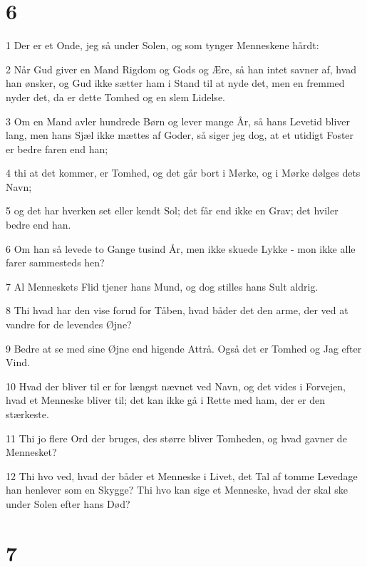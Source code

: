 \chapter{6}

\par 1 Der er et Onde, jeg så under Solen, og som tynger Menneskene hårdt:
\par 2 Når Gud giver en Mand Rigdom og Gods og Ære, så han intet savner af, hvad han ønsker, og Gud ikke sætter ham i Stand til at nyde det, men en fremmed nyder det, da er dette Tomhed og en slem Lidelse.
\par 3 Om en Mand avler hundrede Børn og lever mange År, så hans Levetid bliver lang, men hans Sjæl ikke mættes af Goder, så siger jeg dog, at et utidigt Foster er bedre faren end han;
\par 4 thi at det kommer, er Tomhed, og det går bort i Mørke, og i Mørke dølges dets Navn;
\par 5 og det har hverken set eller kendt Sol; det får end ikke en Grav; det hviler bedre end han.
\par 6 Om han så levede to Gange tusind År, men ikke skuede Lykke - mon ikke alle farer sammesteds hen?
\par 7 Al Menneskets Flid tjener hans Mund, og dog stilles hans Sult aldrig.
\par 8 Thi hvad har den vise forud for Tåben, hvad båder det den arme, der ved at vandre for de levendes Øjne?
\par 9 Bedre at se med sine Øjne end higende Attrå. Også det er Tomhed og Jag efter Vind.
\par 10 Hvad der bliver til er for længst nævnet ved Navn, og det vides i Forvejen, hvad et Menneske bliver til; det kan ikke gå i Rette med ham, der er den stærkeste.
\par 11 Thi jo flere Ord der bruges, des større bliver Tomheden, og hvad gavner de Mennesket?
\par 12 Thi hvo ved, hvad der båder et Menneske i Livet, det Tal af tomme Levedage han henlever som en Skygge? Thi hvo kan sige et Menneske, hvad der skal ske under Solen efter hans Død?

\chapter{7}

